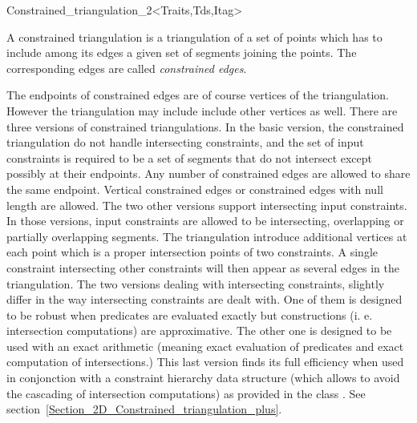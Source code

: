 

\begin{ccRefClass}{Constrained_triangulation_2<Traits,Tds,Itag>}  %


\ccDefinition  
A constrained triangulation is a triangulation of a set of points
which has to include among its edges 
a given set of segments joining the points. The corresponding 
edges are called {\em constrained edges}. 

The endpoints of constrained edges are of course vertices of the
triangulation. However the triangulation may include
include other vertices as well.
There are three versions of  constrained triangulations.
In the basic version, the constrained triangulation 
do not handle intersecting constraints, and the set of input 
constraints is required to be a set of segments that do not intersect
except possibly at their endpoints. Any number of constrained edges
are allowed to share the same endpoint.  Vertical constrained edges or
constrained edges with null length are allowed.
The two other versions support intersecting input constraints.
In those versions, input constraints are allowed to be
intersecting, overlapping or partially
overlapping segments.
The triangulation introduce  additional  vertices at each point which
is a proper intersection points of  two 
constraints. A single constraint intersecting other
constraints will then appear as several edges in the triangulation.
The two versions dealing with intersecting constraints, slightly differ
in the way intersecting constraints are dealt with. One of them is
designed to be robust when predicates are evaluated exactly but
constructions (i. e.  intersection computations) are
approximative.
The other one is designed to be used 
with an exact arithmetic (meaning exact
evaluation of predicates and exact computation of intersections.)
This last version finds its full efficiency  when used in conjonction
with a constraint hierarchy data structure (which allows to avoid the
cascading of intersection computations)
as provided in the class
. See section~\ref{Section_2D_Constrained_triangulation_plus}.



\end{ccRefClass}
